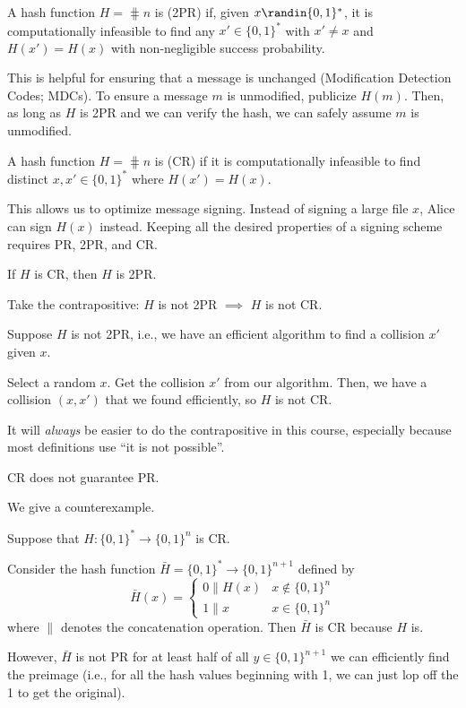 \documentclass[class=co487,tikz,notes]{agony}
\begin{document}
\begin{defn}
  A hash function $H = \hash{n}$ is  (2PR) if,
  given $x \randin \{0,1\}^*$, it is computationally infeasible to find
  any $x' \in \{0,1\}^*$ with $x' \neq x$ and $H(x') = H(x)$ with non-negligible success probability.
\end{defn}

This is helpful for ensuring that a message is unchanged
(Modification Detection Codes; MDCs).
To ensure a message $m$ is unmodified, publicize $H(m)$.
Then, as long as $H$ is 2PR and we can verify the hash,
we can safely assume $m$ is unmodified.

\begin{defn}
  A hash function $H = \hash{n}$ is  (CR)
  if it is computationally infeasible to find distinct $x,x' \in \{0,1\}^*$
  where $H(x') = H(x)$.
\end{defn}

This allows us to optimize message signing.
Instead of signing a large file $x$, Alice can sign $H(x)$ instead.
Keeping all the desired properties of a signing scheme
requires PR, 2PR, and CR.


\begin{prop}
  If $H$ is CR, then $H$ is 2PR.
\end{prop}
\begin{prf}
  Take the contrapositive: $H$ is not 2PR $\implies$ $H$ is not CR.

  Suppose $H$ is not 2PR, i.e., we have an efficient algorithm
  to find a collision $x'$ given $x$.

  Select a random $x$. Get the collision $x'$ from our algorithm.
  Then, we have a collision $(x,x')$ that we found efficiently,
  so $H$ is not CR.
\end{prf}

It will \emph{always} be easier to do the contrapositive in this course,
especially because most definitions use ``it is not possible''.

\begin{prop}
  CR does not guarantee PR.
\end{prop}
\begin{prf}
  We give a counterexample.

  Suppose that $H : \{0,1\}^* \to \{0,1\}^n$ is CR.

  Consider the hash function $\bar H = \{0,1\}^* \to \{0,1\}^{n+1}$ defined by
  \[
    \bar H(x) = \begin{cases}
      0 \| H(x) & x \not\in \{0,1\}^n \\
      1 \| x    & x \in \{0,1\}^n
    \end{cases}
  \]
  where $\|$ denotes the concatenation operation. Then $\bar H$ is CR because $H$ is.

  However, $\bar H$ is not PR for at least half of all $y \in \{0,1\}^{n+1}$
  we can efficiently find the preimage (i.e., for all the hash values beginning with 1,
  we can just lop off the 1 to get the original).
\end{prf}
\end{document}
